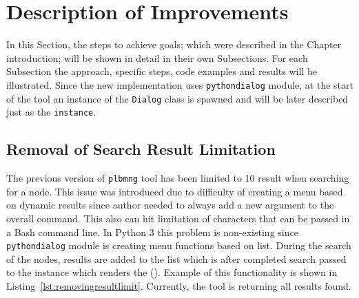 \section{Description of Improvements}
\label{section:implementapproach}
In this Section, the steps to achieve goals; which were described in the Chapter introduction; will be shown in detail in their own Subsections. For each Subsection the approach, specific steps, code examples and results will be illustrated. Since the new implementation uses \texttt{pythondialog} module, at the start of the tool an instance of the \texttt{Dialog} class is spawned and will be later described just as the \texttt{instance}.
\subsection{Removal of Search Result Limitation}
The previous version of \texttt{plbmng} tool has been limited to 10 result when searching for a node. This issue was introduced due to difficulty of creating a menu based on dynamic results since author needed to always add a new argument to the overall command. This also can hit limitation of characters that can be passed in a Bash command line. In Python 3 this problem is non-existing since \texttt{pythondialog} module is creating menu functions based on list. During the search of the nodes, results are added to the list which is after completed search passed to the instance which renders the  (). Example of this functionality is shown in Listing~\ref{lst:removingresultlimit}. Currently, the tool is returning all results found.

